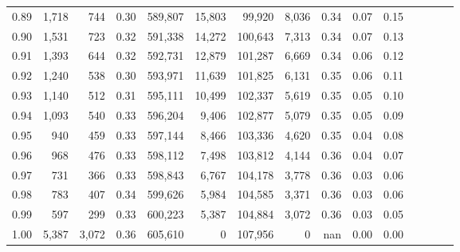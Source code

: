 \begin{tabular}{rrrcrrrrrrrrrrr}
0.89 &   1,718 &    744 &                                       0.30 &  589,807 &   15,803 &   99,920 &    8,036 &  0.34 &  0.07 &                         0.15 \\
0.90 &   1,531 &    723 &                                       0.32 &  591,338 &   14,272 &  100,643 &    7,313 &  0.34 &  0.07 &                         0.13 \\
0.91 &   1,393 &    644 &                                       0.32 &  592,731 &   12,879 &  101,287 &    6,669 &  0.34 &  0.06 &                         0.12 \\
0.92 &   1,240 &    538 &                                       0.30 &  593,971 &   11,639 &  101,825 &    6,131 &  0.35 &  0.06 &                         0.11 \\
0.93 &   1,140 &    512 &                                       0.31 &  595,111 &   10,499 &  102,337 &    5,619 &  0.35 &  0.05 &                         0.10 \\
0.94 &   1,093 &    540 &                                       0.33 &  596,204 &    9,406 &  102,877 &    5,079 &  0.35 &  0.05 &                         0.09 \\
0.95 &     940 &    459 &                                       0.33 &  597,144 &    8,466 &  103,336 &    4,620 &  0.35 &  0.04 &                         0.08 \\
0.96 &     968 &    476 &                                       0.33 &  598,112 &    7,498 &  103,812 &    4,144 &  0.36 &  0.04 &                         0.07 \\
0.97 &     731 &    366 &                                       0.33 &  598,843 &    6,767 &  104,178 &    3,778 &  0.36 &  0.03 &                         0.06 \\
0.98 &     783 &    407 &                                       0.34 &  599,626 &    5,984 &  104,585 &    3,371 &  0.36 &  0.03 &                         0.06 \\
0.99 &     597 &    299 &                                       0.33 &  600,223 &    5,387 &  104,884 &    3,072 &  0.36 &  0.03 &                         0.05 \\
1.00 &   5,387 &  3,072 &                                       0.36 &  605,610 &        0 &  107,956 &        0 &   nan &  0.00 &                         0.00 \\
\bottomrule
\end{tabular}
